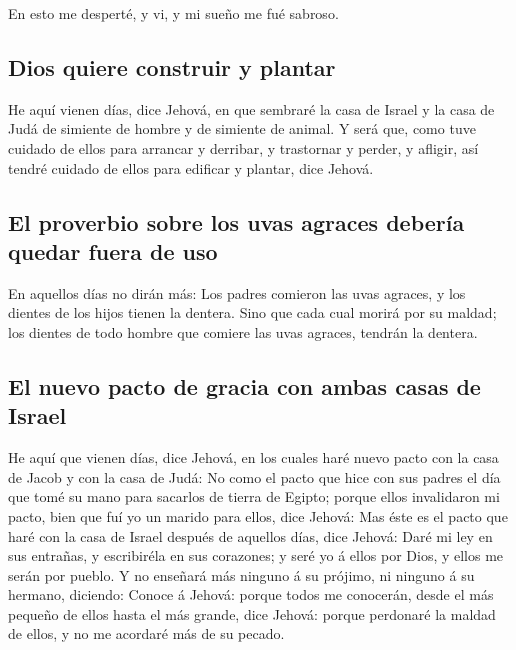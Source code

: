  En esto me desperté, y vi, y mi sueño me fué sabroso.

\hypertarget{dios-quiere-construir-y-plantar}{%
\subsection{Dios quiere construir y
plantar}\label{dios-quiere-construir-y-plantar}}

 He aquí vienen días, dice Jehová, en que sembraré la
casa de Israel y la casa de Judá de simiente de hombre y de simiente de
animal.  Y será que, como tuve cuidado de ellos para
arrancar y derribar, y trastornar y perder, y afligir, así tendré
cuidado de ellos para edificar y plantar, dice Jehová.

\hypertarget{el-proverbio-sobre-los-uvas-agraces-deberuxeda-quedar-fuera-de-uso}{%
\subsection{El proverbio sobre los uvas agraces debería quedar fuera de
uso}\label{el-proverbio-sobre-los-uvas-agraces-deberuxeda-quedar-fuera-de-uso}}

 En aquellos días no dirán más: Los padres comieron las
uvas agraces, y los dientes de los hijos tienen la dentera.
 Sino que cada cual morirá por su maldad; los dientes de
todo hombre que comiere las uvas agraces, tendrán la dentera.

\hypertarget{el-nuevo-pacto-de-gracia-con-ambas-casas-de-israel}{%
\subsection{El nuevo pacto de gracia con ambas casas de
Israel}\label{el-nuevo-pacto-de-gracia-con-ambas-casas-de-israel}}

 He aquí que vienen días, dice Jehová, en los cuales haré
nuevo pacto con la casa de Jacob y con la casa de Judá: 
No como el pacto que hice con sus padres el día que tomé su mano para
sacarlos de tierra de Egipto; porque ellos invalidaron mi pacto, bien
que fuí yo un marido para ellos, dice Jehová:  Mas éste
es el pacto que haré con la casa de Israel después de aquellos días,
dice Jehová: Daré mi ley en sus entrañas, y escribiréla en sus
corazones; y seré yo á ellos por Dios, y ellos me serán por pueblo.
 Y no enseñará más ninguno á su prójimo, ni ninguno á su
hermano, diciendo: Conoce á Jehová: porque todos me conocerán, desde el
más pequeño de ellos hasta el más grande, dice Jehová: porque perdonaré
la maldad de ellos, y no me acordaré más de su pecado.

